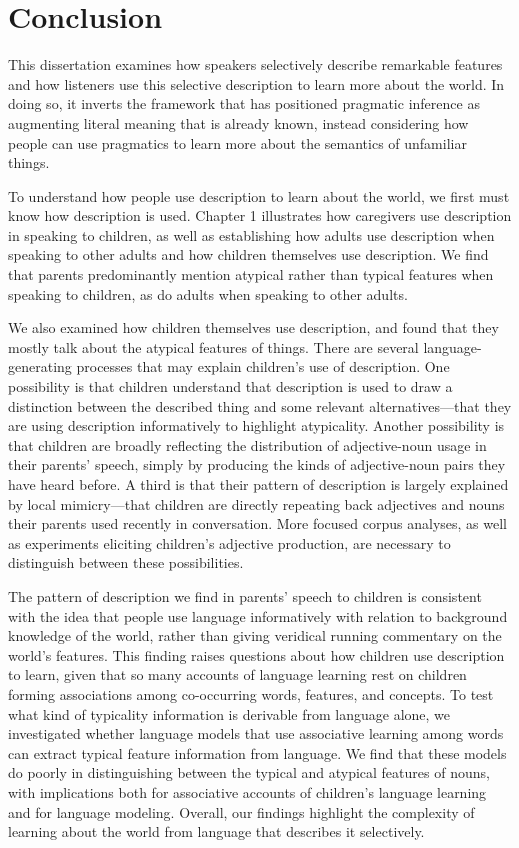 \documentclass{ucetd}
\begin{document}
\hypertarget{conclusion-1}{%
\chapter*{Conclusion}\label{conclusion-1}}

This dissertation examines how speakers selectively describe remarkable
features and how listeners use this selective description to learn more
about the world. In doing so, it inverts the framework that has
positioned pragmatic inference as augmenting literal meaning that is
already known, instead considering how people can use pragmatics to
learn more about the semantics of unfamiliar things.

To understand how people use description to learn about the world, we
first must know how description is used. Chapter 1 illustrates how
caregivers use description in speaking to children, as well as
establishing how adults use description when speaking to other adults
and how children themselves use description. We find that parents
predominantly mention atypical rather than typical features when
speaking to children, as do adults when speaking to other adults.

We also examined how children themselves use description, and found that
they mostly talk about the atypical features of things. There are
several language-generating processes that may explain children's use of
description. One possibility is that children understand that
description is used to draw a distinction between the described thing
and some relevant alternatives---that they are using description
informatively to highlight atypicality. Another possibility is that
children are broadly reflecting the distribution of adjective-noun usage
in their parents' speech, simply by producing the kinds of
adjective-noun pairs they have heard before. A third is that their
pattern of description is largely explained by local mimicry---that
children are directly repeating back adjectives and nouns their parents
used recently in conversation. More focused corpus analyses, as well as
experiments eliciting children's adjective production, are necessary to
distinguish between these possibilities.

The pattern of description we find in parents' speech to children is
consistent with the idea that people use language informatively with
relation to background knowledge of the world, rather than giving
veridical running commentary on the world's features. This finding
raises questions about how children use description to learn, given that
so many accounts of language learning rest on children forming
associations among co-occurring words, features, and concepts. To test
what kind of typicality information is derivable from language alone, we
investigated whether language models that use associative learning among
words can extract typical feature information from language. We find
that these models do poorly in distinguishing between the typical and
atypical features of nouns, with implications both for associative
accounts of children's language learning and for language modeling.
Overall, our findings highlight the complexity of learning about the
world from language that describes it selectively.
\end{document}
